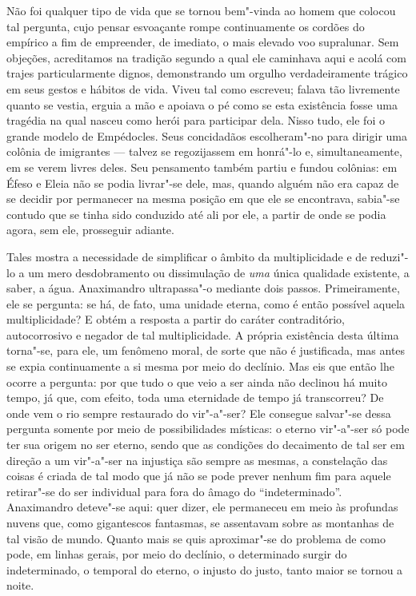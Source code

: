 Não foi qualquer tipo de vida que se tornou bem"-vinda ao homem que colocou
tal pergunta, cujo pensar esvoaçante rompe continuamente os cordões do
empírico a fim de empreender, de imediato, o mais elevado voo supralunar. Sem
objeções, acreditamos na tradição segundo a qual ele \label{acreditamosnatradicao} 
caminhava aqui e acolá com trajes particularmente
dignos, demonstrando um orgulho verdadeiramente trágico em seus gestos e
hábitos de vida. Viveu tal como escreveu; falava tão livremente quanto se
vestia, erguia a mão e apoiava o pé como se esta existência fosse uma
tragédia na qual nasceu como herói para participar dela. Nisso tudo, ele foi
o grande modelo de Empédocles. Seus concidadãos escolheram"-no para dirigir
uma colônia de imigrantes --- talvez se regozijassem em honrá"-lo e,
simultaneamente, em se verem livres deles. Seu pensamento também partiu e
fundou colônias: em Éfeso e Eleia não se podia livrar"-se dele, mas, quando
alguém não era capaz de se decidir por permanecer na mesma posição em que ele
se encontrava, sabia"-se contudo que se tinha sido conduzido até ali por ele,
a partir de onde se podia agora, sem ele, prosseguir adiante.

Tales mostra a necessidade de simplificar o âmbito da multiplicidade e de
reduzi"-lo a um mero desdobramento ou dissimulação de \textit{uma} única
qualidade existente, a saber, a água. Anaximandro ultrapassa"-o mediante dois
passos. Primeiramente, ele se pergunta: se há, de fato, uma unidade eterna,
como é então possível aquela multiplicidade? E obtém a resposta a partir do
caráter contraditório, autocorrosivo e negador de tal multiplicidade. A
própria existência desta última torna"-se, para ele, um fenômeno moral, de
sorte que não é justificada, mas antes se expia continuamente a si mesma por
meio do declínio. Mas eis que então lhe ocorre a pergunta: por que tudo o que
veio a ser ainda não declinou há muito tempo, já que, com efeito, toda uma
eternidade de tempo já transcorreu? De onde vem o rio sempre restaurado do
vir"-a"-ser? Ele consegue salvar"-se dessa pergunta somente por meio de
possibilidades místicas: o eterno vir"-a"-ser só pode ter sua origem no ser
eterno, sendo que as condições do decaimento de tal ser em direção a um
vir"-a"-ser na injustiça são sempre as mesmas, a constelação das coisas é
criada de tal modo que já não se pode prever nenhum fim para aquele
retirar"-se do ser individual para fora do âmago do ``indeterminado''.
Anaximandro deteve"-se aqui: quer dizer, ele permaneceu em meio às profundas
nuvens que, como gigantescos fantasmas, se assentavam sobre as montanhas de
tal visão de mundo. Quanto mais se quis aproximar"-se do problema de como
pode, em linhas gerais, por meio do declínio, o determinado surgir do
indeterminado, o temporal do eterno, o injusto do justo, tanto maior se
tornou a noite.

